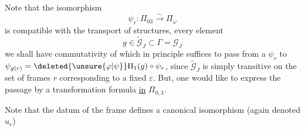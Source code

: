Note that the isomorphism
\[
\psi_r:\Pi_{03}\xrightarrow{\sim}\Pi_\omega
\]
is compatible with the transport of structures,   every element
\[
g\in\widetilde{\mathcal G}_J\subset\Gamma=\mathcal G_J
\]
\inserted{
\[
\begin{aligned}
\widetilde{\mathcal G}_J=\Gamma_{P_\varepsilon}&=\left\{(g,\tau^{\operatorname{sg}g}\in\mathcal G_J\times\deleted{\{1,\tau\}}\inserted{\mathbb Z/2\mathbb Z}\ \middle|\ \begin{array}{l}\alpha=0\text{ if }\operatorname{sg}g=1\\\alpha=1\text{ if }\operatorname{sg}g=-1\end{array}\right\}\\
&=\{g\in\Gamma\mid g_{\uline{\varepsilon}}^{(\varepsilon)}=\operatorname{id}_{\uline{\varepsilon}}\}
\end{aligned}
\]
}
we shall have commutativity of
which in principle suffices to pass from a $\psi_r$ to $\psi_{g(r)}=\deleted{\unsure{\varphi|\psi}}\Pi_1(g)\circ\psi_r$, since  $\widetilde{\mathcal G}_J$ is simply transitive on the set of frames $r$ corresponding to a fixed $\varepsilon$. But, one would like to express the passage by a transformation formula \uline{in} $\Pi_{0,3}$.

Note that the datum of the frame  defines a canonical isomorphism (again denoted $u_r$)
